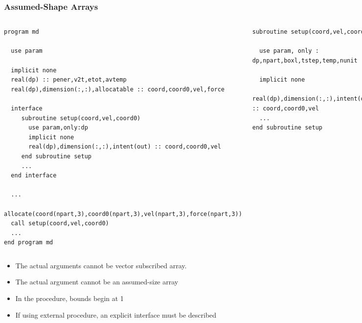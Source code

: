 \documentclass[slidestop,mathserif,compress,xcolor=svgnames]{beamer}
\newenvironment{eblock}[0]
{
\begin{beamerboxesrounded}[upper=uppercol2,lower=lowercol2,shadow=true]}
{\end{beamerboxesrounded}}
\begin{document}
\begin{frame}[fragile]
  \frametitle{\small Assumed-Shape Arrays}
  {\fontsize{4}{5}
    \begin{columns}
    \column{6cm}
    \begin{eblock}{}
      \begin{verbatim}
program md

  use param

  implicit none
  real(dp) :: pener,v2t,etot,avtemp
  real(dp),dimension(:,:),allocatable :: coord,coord0,vel,force

  interface
     subroutine setup(coord,vel,coord0)   
       use param,only:dp
       implicit none
       real(dp),dimension(:,:),intent(out) :: coord,coord0,vel
     end subroutine setup
     ...
  end interface
  
  ...
  allocate(coord(npart,3),coord0(npart,3),vel(npart,3),force(npart,3))
  call setup(coord,vel,coord0)   
  ...
end program md
      \end{verbatim}
    \end{eblock}
    \column{5.5cm}
    \begin{eblock}{}
      \begin{verbatim}
subroutine setup(coord,vel,coord0)

  use param, only : dp,npart,boxl,tstep,temp,nunit

  implicit none
  real(dp),dimension(:,:),intent(out) :: coord,coord0,vel
  ...
end subroutine setup
      \end{verbatim}
    \end{eblock}
    \end{columns}
  }
  \begin{itemize}
    \item The actual arguments cannot be vector subscribed array.
    \item The actual argument cannot be an assumed-size array
    \item In the procedure, bounds begin at 1
    \item If using external procedure, an explicit interface must be described
  \end{itemize}
\end{frame}
\end{document}

